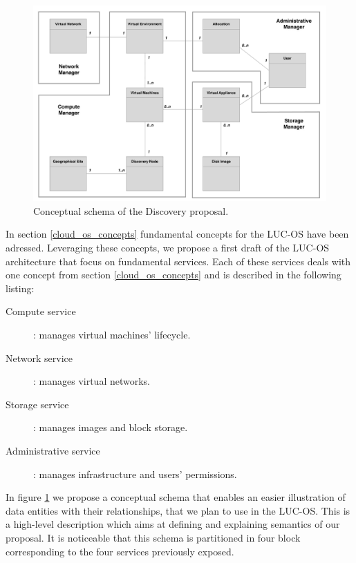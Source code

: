 
\begin{figure}
	\centering
	\includegraphics[width=0.91\linewidth]{Figures/mcd_3.pdf}
	\caption{Conceptual schema of the Discovery proposal.}%
	\label{fig:mcd}%
\end{figure}

In section \ref{cloud_os_concepts} fundamental concepts for the LUC-OS have been
adressed. Leveraging these concepts, we propose a first draft of the LUC-OS
architecture that focus on fundamental services. Each of these services deals 
with one concept from section \ref{cloud_os_concepts} and is described in the 
following listing:

\label{sub:sec:list_services}

\begin{description}

	\item [Compute service] : manages virtual machines' lifecycle.

	\item [Network service] : manages virtual networks.

	\item [Storage service] : manages images and block storage.

	\item [Administrative service] : manages infrastructure and users' permissions.  

\end{description}

In figure \ref{fig:mcd} we propose a conceptual schema that enables an easier 
illustration of data entities with their relationships, that we plan to use in
the LUC-OS. This is a high-level description which aims at defining and 
explaining semantics of our proposal. It is noticeable that this schema is 
partitioned in four block corresponding to the four services previously exposed.

